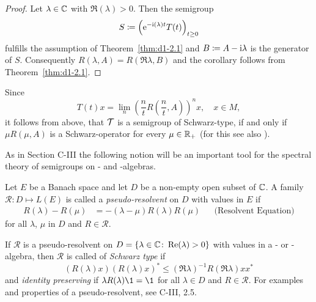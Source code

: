 \begin{proof}
Let $ \lambda \in \mathbb{C} $ with $ \Re(\lambda) > 0 $.
Then the semigroup
\[
S \coloneqq \left(\mathrm{e}^{- \mathrm{i}  (\lambda) t }T(t) \right)_{t \geq 0}
\]
fulfills the assumption of Theorem~\ref{thm:d1-2.1} and $ B \coloneqq A - \mathrm{i} \lambda $ is the generator of $ S $.
Consequently $ R(\lambda,A) = R(\Re\lambda,B) $ and the corollary follows from Theorem~\ref{thm:d1-2.1}.
\end{proof}
\begin{remark}\label{rem:d1-2.3}
Since 
%
\[
	T(t)x = \lim_{n} \left( \frac{n}{t} R\left(\frac{n}{t}, A\right) \right)^{n} x , \quad x \in M , 
\]
%
it follows from above, that $ \mathcal{T} $ is a semigroup of Schwarz-type, if and only if $ \mu R( \mu, A) $ is a Schwarz-operator for every $ \mu \in \mathbb{R}_{+} $ (for this see also \citet{brattelirobinson:1981}).
\end{remark}
As in Section C-III the following notion will be an important tool for the spectral theory of semigroups on \CA- and \WA-algebras.
\begin{definition}\label{def:d1-2.4}
Let $E$ be a Banach space and let $D$ be a non-empty open subset of $\mathbb{C}$.
A family $ \mathcal{R} \colon D \mapsto L(E) $ is called a \emph{pseudo-resolvent} on $ D $ with values in $ E $ if
\begin{align*}
	R(\lambda) - R(\mu) &= -(\lambda - \mu)R(\lambda)R(\mu) &&\text{(Resolvent Equation)}
\end{align*}
for all $ \lambda $, $ \mu $ in $ D $ and $ R \in \mathcal{R} $.
\end{definition}
If $ \mathcal{R} $ is a {pseudo-resolvent} on $ D = \{\lambda \in \mathbb{C} \colon \mathop{}\!\mathrm{Re}(\lambda) > 0\} $ with values in a \CA- or \WA-algebra, then $ \mathcal{R} $ is called of \emph{Schwarz type} if
\[
	(R(\lambda)x)(R(\lambda)x)^{*} \leq (\Re \lambda)^{-1} R(\Re\lambda)xx^{*}
\]
and \emph{identity preserving} if $ \lambda R(\lambda)\1 = \1 $ for all $ \lambda \in D $ and $ R \in \mathcal{R} $.
For examples and properties of a pseudo-resolvent, see C-III, 2.5.

